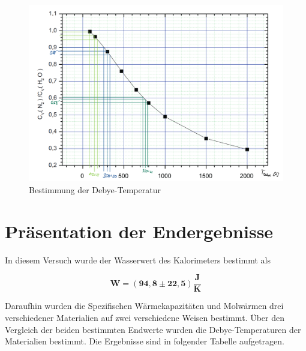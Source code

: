 \documentclass{article}
\begin{document}
\begin{figure} [!h]
    \centering
    \includegraphics[width=\textwidth]{graphics/debye.pdf}
    \caption{Bestimmung der Debye-Temperatur}
\end{figure}

\newpage
\section{Präsentation der Endergebnisse}

In diesem Versuch wurde der Wasserwert des Kalorimeters bestimmt als 

\begin{equation}
    \bm{W} = \bm{(94,8 \pm 22,5)} \frac{\textbf{J}}{\textbf{K}}
\end{equation}

Daraufhin wurden die Spezifischen Wärmekapazitäten und Molwärmen drei verschiedener Materialien auf zwei verschiedene Weisen bestimmt. Über den Vergleich der beiden bestimmten Endwerte wurden die Debye-Temperaturen der Materialien bestimmt. Die Ergebnisse sind in folgender Tabelle aufgetragen. 
\end{document}
